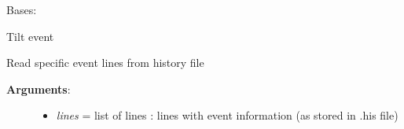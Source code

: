 \documentclass[a4paper,10pt,english]{sphinxmanual}
\begin{document}

\begin{fulllineitems}
\label{pynoddy:pynoddy.events.Tilt}
Bases: {\hyperref[pynoddy:pynoddy.events.Event]{\emph{}}}

Tilt event

\begin{fulllineitems}
\label{pynoddy:pynoddy.events.Tilt.parse_event_lines}
Read specific event lines from history file
\begin{description}
\item[{\textbf{Arguments}:}] \leavevmode\begin{itemize}
\item {} 
\emph{lines} = list of lines : lines with event information (as stored in .his file)

\end{itemize}

\end{description}

\end{fulllineitems}


\end{fulllineitems}

\end{document}
